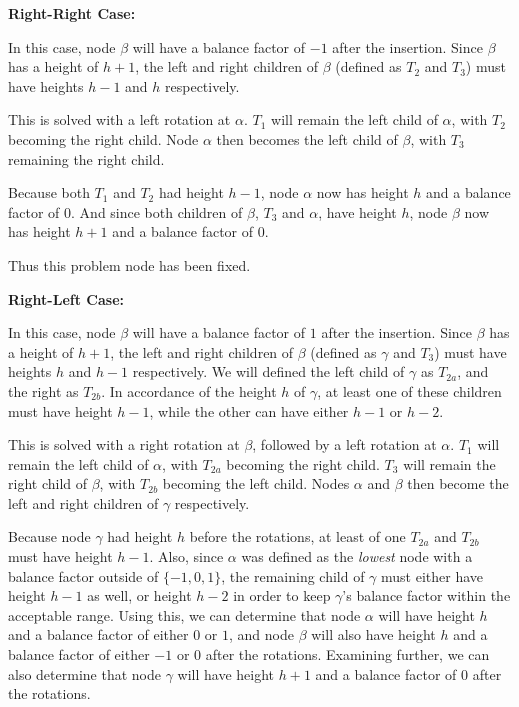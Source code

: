 \documentclass[a4paper, 12pt, titlepage]{article}
\begin{document}
\noindent
\textbf{Right-Right Case:}

In this case,
node $\beta$ will have a balance factor of $-1$ after the insertion.
Since $\beta$ has a height of $h+1$,
the left and right children of $\beta$
(defined as $T_2$ and $T_3$)
must have heights $h-1$ and $h$ respectively.

This is solved with a left rotation at $\alpha$.
$T_1$ will remain the left child of $\alpha$,
with $T_2$ becoming the right child.
Node $\alpha$ then becomes the left child of $\beta$,
with $T_3$ remaining the right child.

Because both $T_1$ and $T_2$ had height $h-1$,
node $\alpha$ now has height $h$ and a balance factor of $0$.
And since both children of $\beta$,
$T_3$ and $\alpha$,
have height $h$,
node $\beta$ now has height $h+1$ and a balance factor of $0$.

Thus this problem node has been fixed.

\noindent
\textbf{Right-Left Case:}

In this case,
node $\beta$ will have a balance factor of $1$ after the insertion.
Since $\beta$ has a height of $h+1$,
the left and right children of $\beta$
(defined as $\gamma$ and $T_3$)
must have heights $h$ and $h-1$ respectively.
We will defined the left child of $\gamma$ as $T_{2a}$,
and the right as $T_{2b}$.
In accordance of the height $h$ of $\gamma$,
at least one of these children must have height $h-1$,
while the other can have either $h-1$ or $h-2$.

This is solved with a right rotation at $\beta$,
followed by a left rotation at $\alpha$.
$T_1$ will remain the left child of $\alpha$,
with $T_{2a}$ becoming the right child.
$T_3$ will remain the right child of $\beta$,
with $T_{2b}$ becoming the left child.
Nodes $\alpha$ and $\beta$ then become the left and right children of $\gamma$ respectively.

Because node $\gamma$ had height $h$ before the rotations,
at least of one $T_{2a}$ and $T_{2b}$ must have height $h-1$.
Also, since $\alpha$ was defined as the \textit{lowest} node with a balance factor outside of $\{-1,0,1\}$,
the remaining child of $\gamma$ must either have height $h-1$ as well,
or height $h-2$ in order to keep $\gamma$'s balance factor within the acceptable range.
Using this,
we can determine that node $\alpha$ will have height $h$ and a balance factor of either $0$ or $1$,
and node $\beta$ will also have height $h$ and a balance factor of either $-1$ or $0$ after the rotations.
Examining further,
we can also determine that node $\gamma$ will have height $h+1$ and a balance factor of $0$ after the rotations.
\end{document}
